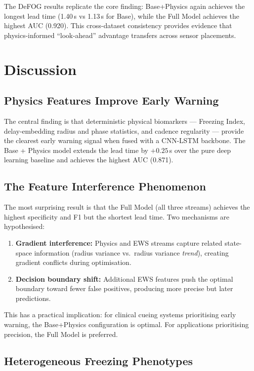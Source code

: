 \documentclass[12pt,a4paper,oneside]{report}
\numberwithin{equation}{chapter}
\numberwithin{figure}{chapter}
\numberwithin{table}{chapter}
\begin{document}
The DeFOG results replicate the core finding: Base+Physics again achieves the longest lead time (1.40\,s vs 1.13\,s for Base), while the Full Model achieves the highest AUC (0.920). This cross-dataset consistency provides evidence that physics-informed ``look-ahead'' advantage transfers across sensor placements.

\section{Discussion}

\subsection{Physics Features Improve Early Warning}

The central finding is that deterministic physical biomarkers --- Freezing Index, delay-embedding radius and phase statistics, and cadence regularity --- provide the clearest early warning signal when fused with a CNN-LSTM backbone. The Base + Physics model extends the lead time by $+0.25$\,s over the pure deep learning baseline and achieves the highest AUC (0.871).

\subsection{The Feature Interference Phenomenon}

The most surprising result is that the Full Model (all three streams) achieves the highest specificity and F1 but the shortest lead time. Two mechanisms are hypothesised:

\begin{enumerate}[leftmargin=*, itemsep=3pt]
  \item \textbf{Gradient interference:} Physics and EWS streams capture related state-space information (radius variance vs.\ radius variance \textit{trend}), creating gradient conflicts during optimisation.
  \item \textbf{Decision boundary shift:} Additional EWS features push the optimal boundary toward fewer false positives, producing more precise but later predictions.
\end{enumerate}

This has a practical implication: for clinical cueing systems prioritising early warning, the Base+Physics configuration is optimal. For applications prioritising precision, the Full Model is preferred.

\subsection{Heterogeneous Freezing Phenotypes}
\end{document}
